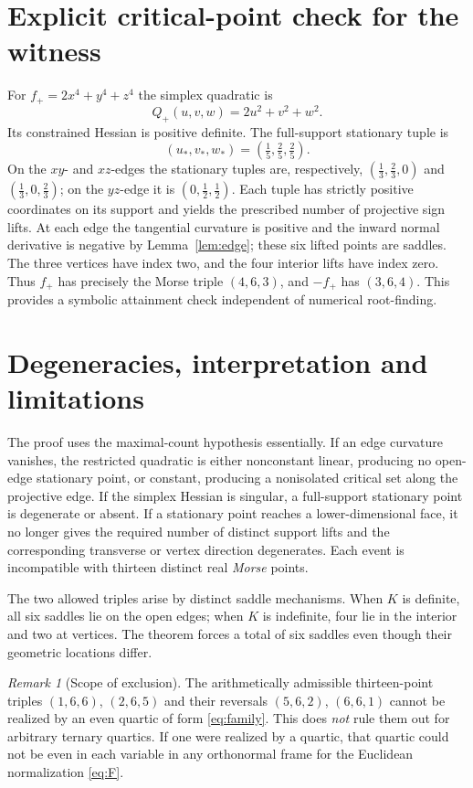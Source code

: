 \documentclass[10pt,a4paper]{article}
\theoremstyle{plain}
\theoremstyle{remark}
\newtheorem{remark}[theorem]{Remark}
\begin{document}
\section{Explicit critical-point check for the witness}
For $f_+=2x^4+y^4+z^4$ the simplex quadratic is
\[
 Q_+(u,v,w)=2u^2+v^2+w^2.
\]
Its constrained Hessian is positive definite. The full-support stationary tuple is
\[
 (u_*,v_*,w_*)=\left(\tfrac15,\tfrac25,\tfrac25\right).
\]
On the $xy$- and $xz$-edges the stationary tuples are, respectively,
$(\tfrac13,\tfrac23,0)$ and $(\tfrac13,0,\tfrac23)$; on the $yz$-edge it is $(0,\tfrac12,\tfrac12)$. Each tuple has strictly positive coordinates on its support and yields the prescribed number of projective sign lifts. At each edge the tangential curvature is positive and the inward normal derivative is negative by Lemma~\ref{lem:edge}; these six lifted points are saddles. The three vertices have index two, and the four interior lifts have index zero. Thus $f_+$ has precisely the Morse triple $(4,6,3)$, and $-f_+$ has $(3,6,4)$. This provides a symbolic attainment check independent of numerical root-finding.

\section{Degeneracies, interpretation and limitations}
The proof uses the maximal-count hypothesis essentially. If an edge curvature vanishes, the restricted quadratic is either nonconstant linear, producing no open-edge stationary point, or constant, producing a nonisolated critical set along the projective edge. If the simplex Hessian is singular, a full-support stationary point is degenerate or absent. If a stationary point reaches a lower-dimensional face, it no longer gives the required number of distinct support lifts and the corresponding transverse or vertex direction degenerates. Each event is incompatible with thirteen distinct real \emph{Morse} points.

The two allowed triples arise by distinct saddle mechanisms. When $K$ is definite, all six saddles lie on the open edges; when $K$ is indefinite, four lie in the interior and two at vertices. The theorem forces a total of six saddles even though their geometric locations differ.

\begin{remark}[Scope of exclusion]
The arithmetically admissible thirteen-point triples $(1,6,6)$, $(2,6,5)$ and their reversals $(5,6,2)$, $(6,6,1)$ cannot be realized by an even quartic of form \eqref{eq:family}. This does \emph{not} rule them out for arbitrary ternary quartics. If one were realized by a quartic, that quartic could not be even in each variable in any orthonormal frame for the Euclidean normalization \eqref{eq:F}.
\end{remark}
\end{document}
